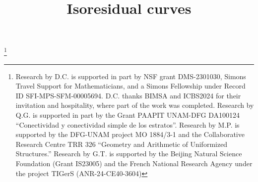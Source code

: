 \documentclass[JEP,XML,SOM,Unicode,NoFloatCountersInSection,published]{cedram}
\theoremstyle{definition}
\begin{document}
\frontmatter
\title{Isoresidual curves}

\author[\initial{D.} \lastname{Chen}]{ }
\address{Department of Mathematics, Boston College,\\
Chestnut Hill, MA 02467, USA}

\author[\initial{Q.} \lastname{Gendron}]{ }
\address{Instituto de Matemáticas de la UNAM,\\
Ciudad Universitaria, Tenochtitlán, 04510, México}

\author[\initial{M.} \lastname{Prado}]{ }
\address{Goethe University,\\
Frankfurt am Main, Hessen 60325, Germany}

\author[\initial{G.} \lastname{Tahar}]{ }
\address{Beijing Institute of Mathematical Sciences and Applications,\\
Huairou District, Beijing, China}

\thanks{Research by D.C. is supported in part by NSF grant DMS-2301030, Simons Travel Support for Mathematicians, and a Simons Fellowship under Record ID SFI-MPS-SFM-00005694. D.C. thanks BIMSA and ICBS2024 for their invitation and hospitality, where part of the work was completed. Research by Q.G. is supported in part by the Grant PAAPIT UNAM-DFG DA100124 ``Conectividad y conectividad simple de los estratos''. Research by M.P. is supported by the DFG-UNAM project MO 1884/3-1 and the Collaborative Research Centre TRR 326 ``Geometry and Arithmetic of Uniformized Structures.'' Research by G.T. is supported by the Beijing Natural Science Foundation (Grant IS23005) and the French National Research Agency under the project TIGerS (ANR-24-CE40-3604)}
\end{document}
